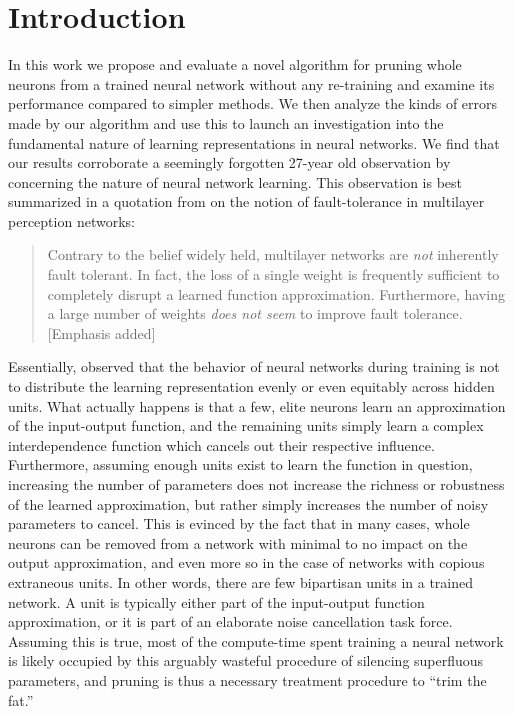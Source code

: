 \section{Introduction}\label{sec1}

In this work we propose and evaluate a novel algorithm for pruning whole neurons from a trained neural network without any re-training and examine its performance compared to simpler methods. We then analyze the kinds of errors made by our algorithm and use this to launch an investigation into the fundamental nature of learning representations in neural networks. We find that our results corroborate a seemingly forgotten 27-year old observation by \cite{mozer1989skeletonization} concerning the nature of neural network learning. This observation is best summarized in a quotation from \cite{segee1991fault} on the notion of fault-tolerance in multilayer perception networks:

\begin{quotation}
Contrary to the belief widely held, multilayer networks are \textit{not} inherently fault tolerant. In fact, the loss of a single weight is frequently sufficient to completely disrupt a learned function approximation. Furthermore, having a large number of weights \textit{does not seem} to improve fault tolerance. [Emphasis added]
\end{quotation}

Essentially, \cite{mozer1989using} observed that the behavior of neural networks during training is not to distribute the learning representation evenly or even equitably across hidden units. What actually happens is that a few, elite neurons learn an approximation of the input-output function, and the remaining units simply learn a complex interdependence function which cancels out their respective influence. Furthermore, assuming enough units exist to learn the function in question, increasing the number of parameters does not increase the richness or robustness of the learned approximation, but rather simply increases the number of noisy parameters to cancel. This is evinced by the fact that in many cases, whole neurons can be removed from a network with minimal to no impact on the output approximation, and even more so in the case of networks with copious extraneous units. In other words, there are few bipartisan units in a trained network. A unit is typically either part of the input-output function approximation, or it is part of an elaborate noise cancellation task force. Assuming this is true, most of the compute-time spent training a neural network is likely occupied by this arguably wasteful procedure of silencing superfluous parameters, and pruning is thus a necessary treatment procedure to ``trim the fat.'' 

